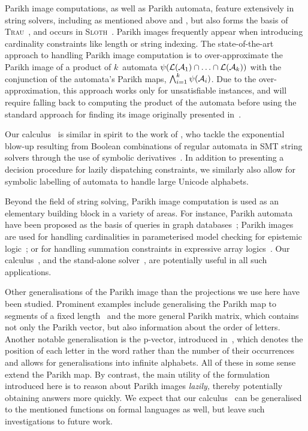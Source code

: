 Parikh image computations, as well as Parikh automata, feature extensively in
string solvers, including as mentioned above \Ostrich{} and \OstrichPlus{}
\cite{ostrich,ostrich-plus}, but also forms the basis of
\textsc{Trau}~\cite{trau-pldi},
and occurs in \textsc{Sloth}~\cite{sloth}. Parikh images frequently appear when
introducing cardinality constraints like length or string indexing. The
state-of-the-art approach to handling Parikh image computation is to
over-approximate the Parikh image of a product of $k$~automata
$\operatorname{\psi}(\operatorname{\mathcal{L}}(\mathcal{A}_1) \cap \ldots \cap \operatorname{\mathcal{L}}(\mathcal{A}_k))$
with the conjunction of the automata's Parikh maps, $\bigwedge_{i=1}^{k}
\operatorname{\psi}(\mathcal{A}_i)$. Due to the over-approximation,
this approach works only for unsatisfiable instances,
and will require falling back to computing the product of the automata before
using the standard approach for finding its image originally presented
in~\cite{generate-parikh-image}.

Our calculus~\Calculus{} is similar in spirit to the work
of \citeauthor{symbolic-boolean-derivatives}, who tackle the exponential
blow-up resulting from Boolean combinations
of regular automata in SMT string solvers
through the use of symbolic derivatives~\cite{symbolic-boolean-derivatives}.
In addition to presenting a decision procedure for lazily dispatching
constraints, we similarly also allow for symbolic labelling of automata to
handle large Unicode alphabets.

Beyond the field of string solving, Parikh image computation is used
as an elementary building block in a variety of areas.  For instance,
Parikh automata have been proposed as the basis of queries in graph
databases~\cite{graph-queries}; Parikh images are used for handling
cardinalities in parameterised model checking for epistemic
logic~\cite{epistemic-logic}; or for handling summation constraints in
expressive array logics~\cite{rodrigoRaya}. Our calculus~\Calculus{},
and the stand-alone solver~\Catra{},
are potentially useful in all such applications.

Other generalisations of the Parikh image than the projections we use here
have been studied. Prominent examples include generalising the Parikh map to
segments of a fixed length~\cite{KARHUMAKI1980155} and the more general Parikh
matrix, which contains not only the Parikh vector, but also information about
the order of letters. Another notable generalisation is the p-vector, introduced
in~\cite{infinite-words}, which denotes the position of each letter in the word
rather than the number of their occurrences and allows for generalisations into
infinite alphabets. All of these in some sense extend the Parikh map. By
contrast, the main utility of the formulation introduced here is to reason
about Parikh images \emph{lazily,}
thereby potentially obtaining answers more quickly. We expect that our
calculus~\Calculus{} can be generalised to the mentioned functions on
formal languages as well, but leave such investigations to future work.


